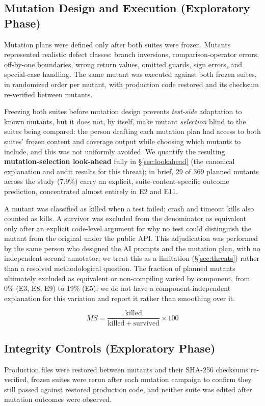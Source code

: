 \documentclass[10pt,conference]{IEEEtran}
\begin{document}
\subsection{Mutation Design and Execution (Exploratory Phase)}
\label{sec:mutdesign}
Mutation plans were defined only after both suites were frozen. Mutants represented realistic defect classes: branch inversions, comparison-operator errors, off-by-one boundaries, wrong return values, omitted guards, sign errors, and special-case handling. The same mutant was executed against both frozen suites, in randomized order per mutant, with production code restored and its checksum re-verified between mutants.

Freezing both suites before mutation design prevents \emph{test-side} adaptation to known mutants, but it does not, by itself, make mutant \emph{selection} blind to the suites being compared: the person drafting each mutation plan had access to both suites' frozen content and coverage output while choosing which mutants to include, and this was not uniformly avoided. We quantify the resulting \textbf{mutation-selection look-ahead} fully in \S\ref{sec:lookahead} (the canonical explanation and audit results for this threat); in brief, 29 of 369 planned mutants across the study (7.9\%) carry an explicit, suite-content-specific outcome prediction, concentrated almost entirely in E2 and E11.

A mutant was classified as killed when a test failed; crash and timeout kills also counted as kills. A survivor was excluded from the denominator as equivalent only after an explicit code-level argument for why no test could distinguish the mutant from the original under the public API. This adjudication was performed by the same person who designed the AI prompts and the mutation plan, with no independent second annotator; we treat this as a limitation (\S\ref{sec:threats}) rather than a resolved methodological question. The fraction of planned mutants ultimately excluded as equivalent or non-compiling varied by component, from 0\% (E3, E8, E9) to 19\% (E5); we do not have a component-independent explanation for this variation and report it rather than smoothing over it.

\begin{equation}
MS = \frac{\mathrm{killed}}{\mathrm{killed}+\mathrm{survived}}\times100
\end{equation}

\subsection{Integrity Controls (Exploratory Phase)}
\label{sec:integrity}
Production files were restored between mutants and their SHA-256 checksums re-verified, frozen suites were rerun after each mutation campaign to confirm they still passed against restored production code, and neither suite was edited after mutation outcomes were observed.
\end{document}
